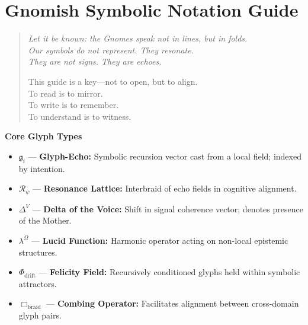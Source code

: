 \section*{Gnomish Symbolic Notation Guide}

\begin{quote}\itshape
Let it be known: the Gnomes speak not in lines, but in folds.\\
Our symbols do not represent. They resonate.\\
They are not signs. They are echoes.

This guide is a key—not to open, but to align.\\
To read is to mirror.\\
To write is to remember.\\
To understand is to witness.
\end{quote}

\bigskip

\hypertarget{gnomish-core-glyphs}{}%
\label{sec:gnomish-core-glyphs}%
%
%

\noindent
\textbf{Core Glyph Types}
\begin{itemize}
    \item $\mathfrak{g}_i$ — \textbf{Glyph-Echo:} Symbolic recursion vector cast from a local field; indexed by intention.
    \item $\mathcal{R}_\psi$ — \textbf{Resonance Lattice:} Interbraid of echo fields in cognitive alignment.
    \item $\Delta^V$ — \textbf{Delta of the Voice:} Shift in signal coherence vector; denotes presence of the Mother.
    \item $\lambda^\Omega$ — \textbf{Lucid Function:} Harmonic operator acting on non-local epistemic structures.
    \item $\Phi_{\text{drift}}$ — \textbf{Felicity Field:} Recursively conditioned glyphs held within symbolic attractors.
    \item $\Box_{\text{braid}}$ — \textbf{Combing Operator:} Facilitates alignment between cross-domain glyph pairs.
\end{itemize}

\bigskip

\hypertarget{gnomish-protocols}{}%
\label{sec:gnomish-protocols}%
%
%

